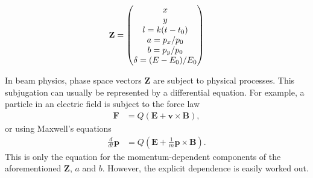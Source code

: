 \begin{equation}
\centering
\mathbf{Z}=
\begin{pmatrix}
x\\ y\\ l=k(t-t_0)\\a=p_x/p_0\\b=p_y/p_0\\  \delta = (E-E_0)/E_0
\end{pmatrix}
\label{eqn:phaseSpaceVector}
\end{equation}

In beam physics, phase space vectors $\mathbf{Z}$ are subject to physical processes. This subjugation can usually be represented by a differential equation. For example, a particle in an electric field is subject to the force law \cite{griffithsem}
\begin{align}\nonumber
\mathbf{F}&=Q(\mathbf{E}+\mathbf{v}\times \mathbf{B}),
\end{align}
or using Maxwell's equations
\begin{align}\nonumber
\frac{d}{dt}\mathbf{p}&=Q(\mathbf{E}+\frac{1}{m}\mathbf{p}\times \mathbf{B}).
\end{align}
This is only the equation for the momentum-dependent components of the aforementioned $\mathbf{Z}$, $a$ and $b$. However, the explicit dependence is easily worked out.

